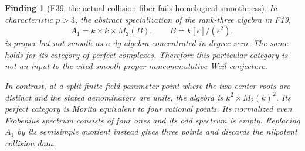 \documentclass[11pt,a4paper]{article}
\newcommand{\fid}[1]{\textsf{#1}}\newcommand{\gate}[1]{\textsf{#1}}
\theoremstyle{named}\newtheorem{finding}{Finding}[section]
\theoremstyle{definition}\newtheorem{definition}[finding]{Definition}
\theoremstyle{remark}\newtheorem{remark}[finding]{Remark}
\begin{document}
\begin{finding}[\fid{F39}: the actual collision fiber fails homological smoothness]\label{f:ncweil}
In characteristic $p>3$, the abstract specialization of the
rank-three algebra in \fid{F19},
\[
 A_1=k\times k\times M_2(B),\qquad B=k[\epsilon]/(\epsilon^2),
\]
is proper but not smooth as a dg algebra concentrated in degree zero.
The same holds for its category of perfect complexes. Therefore this
particular category is not an input to the cited smooth proper
noncommutative Weil conjecture.

In contrast, at a split finite-field parameter point where the two
center roots are distinct and the stated denominators are units,
the algebra is $k^2\times M_2(k)^2$. Its perfect category is Morita
equivalent to four rational points. Its normalized even Frobenius
spectrum consists of four ones and its odd spectrum is empty.
Replacing $A_1$ by its semisimple quotient instead gives three
points and discards the nilpotent collision data.
\end{finding}
\end{document}
